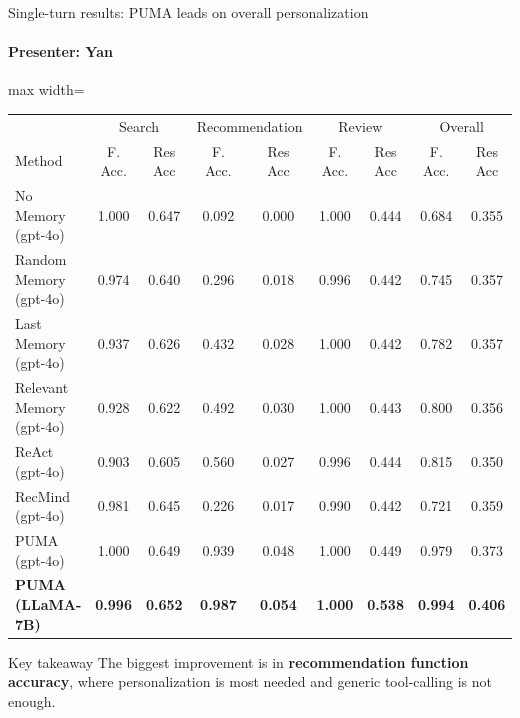 \documentclass[10pt]{beamer}
\newcommand{\speaker}[1]{\framesubtitle{Presenter: #1}}
\begin{document}
\begin{frame}{Single-turn results: PUMA leads on overall personalization}
  \speaker{Yan}
  \scriptsize
  \begin{adjustbox}{max width=\linewidth}
  \begin{tabular}{@{}lcccccccc@{}}
    \toprule
    & \multicolumn{2}{c}{Search} & \multicolumn{2}{c}{Recommendation} & \multicolumn{2}{c}{Review} & \multicolumn{2}{c}{Overall} \\
    Method & F. Acc. & Res Acc & F. Acc. & Res Acc & F. Acc. & Res Acc & F. Acc. & Res Acc \\
    \midrule
    No Memory (gpt-4o) & 1.000 & 0.647 & 0.092 & 0.000 & 1.000 & 0.444 & 0.684 & 0.355 \\
    Random Memory (gpt-4o) & 0.974 & 0.640 & 0.296 & 0.018 & 0.996 & 0.442 & 0.745 & 0.357 \\
    Last Memory (gpt-4o) & 0.937 & 0.626 & 0.432 & 0.028 & 1.000 & 0.442 & 0.782 & 0.357 \\
    Relevant Memory (gpt-4o) & 0.928 & 0.622 & 0.492 & 0.030 & 1.000 & 0.443 & 0.800 & 0.356 \\
    ReAct (gpt-4o) & 0.903 & 0.605 & 0.560 & 0.027 & 0.996 & 0.444 & 0.815 & 0.350 \\
    RecMind (gpt-4o) & 0.981 & 0.645 & 0.226 & 0.017 & 0.990 & 0.442 & 0.721 & 0.359 \\
    PUMA (gpt-4o) & 1.000 & 0.649 & 0.939 & 0.048 & 1.000 & 0.449 & 0.979 & 0.373 \\
    \textbf{PUMA (LLaMA-7B)} & \textbf{0.996} & \textbf{0.652} & \textbf{0.987} & \textbf{0.054} & \textbf{1.000} & \textbf{0.538} & \textbf{0.994} & \textbf{0.406} \\
    \bottomrule
  \end{tabular}
  \end{adjustbox}
  \vspace{0.5em}
  \begin{alertblock}{Key takeaway}
    \small The biggest improvement is in \textbf{recommendation function accuracy}, where personalization is most needed and generic tool-calling is not enough.
  \end{alertblock}
\end{frame}
\end{document}
